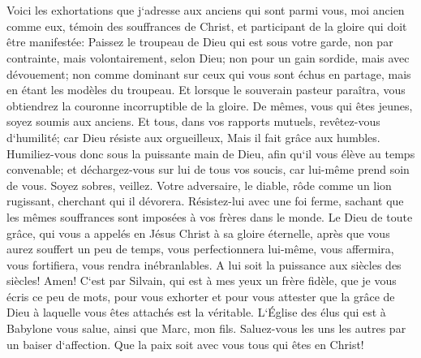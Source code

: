 \chapter{}

\verse Voici les exhortations que j`adresse aux anciens qui sont parmi vous, moi ancien comme eux, témoin des souffrances de Christ, et participant de la gloire qui doit être manifestée: 
\verse Paissez le troupeau de Dieu qui est sous votre garde, non par contrainte, mais volontairement, selon Dieu; non pour un gain sordide, mais avec dévouement; 
\verse non comme dominant sur ceux qui vous sont échus en partage, mais en étant les modèles du troupeau. 
\verse Et lorsque le souverain pasteur paraîtra, vous obtiendrez la couronne incorruptible de la gloire. 
\verse De mêmes, vous qui êtes jeunes, soyez soumis aux anciens. Et tous, dans vos rapports mutuels, revêtez-vous d`humilité; car Dieu résiste aux orgueilleux, Mais il fait grâce aux humbles. 
\verse Humiliez-vous donc sous la puissante main de Dieu, afin qu`il vous élève au temps convenable; 
\verse et déchargez-vous sur lui de tous vos soucis, car lui-même prend soin de vous. 
\verse Soyez sobres, veillez. Votre adversaire, le diable, rôde comme un lion rugissant, cherchant qui il dévorera. 
\verse Résistez-lui avec une foi ferme, sachant que les mêmes souffrances sont imposées à vos frères dans le monde. 
\verse Le Dieu de toute grâce, qui vous a appelés en Jésus Christ à sa gloire éternelle, après que vous aurez souffert un peu de temps, vous perfectionnera lui-même, vous affermira, vous fortifiera, vous rendra inébranlables. 
\verse A lui soit la puissance aux siècles des siècles! Amen! 
\verse C`est par Silvain, qui est à mes yeux un frère fidèle, que je vous écris ce peu de mots, pour vous exhorter et pour vous attester que la grâce de Dieu à laquelle vous êtes attachés est la véritable. 
\verse L`Église des élus qui est à Babylone vous salue, ainsi que Marc, mon fils. 
\verse Saluez-vous les uns les autres par un baiser d`affection. Que la paix soit avec vous tous qui êtes en Christ! 
